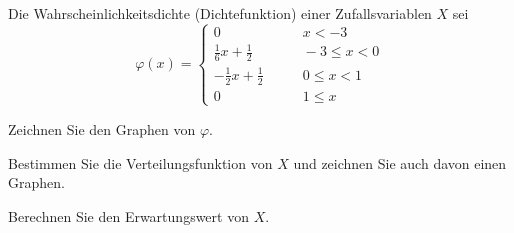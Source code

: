 Die Wahrscheinlichkeitsdichte (Dichtefunktion) einer Zufallsvariablen $X$
sei
\[
\varphi(x)=\begin{cases}
0&\qquad x<-3\\
\frac16x+\frac12&\qquad -3\le x<0\\
-\frac12x+\frac12&\qquad 0\le x< 1\\
0&\qquad 1\le x
\end{cases}
\]
\begin{teilaufgaben}
\item Zeichnen Sie den Graphen von $\varphi$.
\item Bestimmen Sie die Verteilungsfunktion von $X$ und zeichnen Sie
auch davon einen Graphen.
\item Berechnen Sie den Erwartungswert von $X$.
\end{teilaufgaben}


